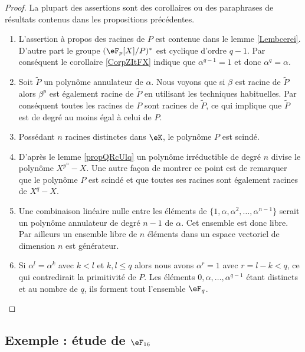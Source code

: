 \begin{proof}
    La plupart des assertions sont des corollaires ou des paraphrases de résultats contenus dans les propositions précédentes.
    \begin{enumerate}
        \item
            L'assertion à propos des racines de \( P\) est contenue dans le lemme \ref{Lembcerei}. D'autre part le groupe \( (\eF_p[X]/P)^*\) est cyclique d'ordre \( q-1\). Par conséquent le corollaire \ref{CorpZItFX} indique que \( \alpha^{q-1}=1\) et donc \( \alpha^q=\alpha\).
        \item
            Soit \( \tilde P\) un polynôme annulateur de \( \alpha\). Nous voyons que si \( \beta\) est racine de \( \tilde P\) alors \( \beta^p\) est également racine de \( \tilde P\) en utilisant les techniques habituelles. Par conséquent toutes les racines de \( P\) sont racines de \( \tilde P\), ce qui implique que \( \tilde P\) est de degré au moins égal à celui de \( P\).
        \item
            Possédant \( n\) racines distinctes dans \( \eK\), le polynôme \( P\) est scindé.
        \item
            D'après le lemme \ref{propQRcUlq} un polynôme irréductible de degré \( n\) divise le polynôme \( X^{p^n}-X\). Une autre façon de montrer ce point est de remarquer que le polynôme \( P\) est scindé et que toutes ses racines sont également racines de \( X^q-X\).
        \item
            Une combinaison linéaire nulle entre les éléments de \( \{ 1,\alpha,\alpha^2,\ldots, \alpha^{n-1} \}\) serait un polynôme annulateur de degré \( n-1\) de \( \alpha\). Cet ensemble est donc libre. Par ailleurs un ensemble libre de \( n\) éléments dans un espace vectoriel de dimension \( n\) est générateur.
        \item
            Si \( \alpha^l=\alpha^k\) avec \( k<l\) et \( k,l\leq q\) alors nous avons \( \alpha^r=1\) avec \( r=l-k<q\), ce qui contredirait la primitivité de \( P\). Les éléments \( 0,\alpha,\ldots, \alpha^{q-1}\) étant distincts et au nombre de \( q\), ils forment tout l'ensemble \( \eF_q\).

    \end{enumerate}
\end{proof}

\subsection{Exemple : étude de \texorpdfstring{$\eF_{16}$}{F16}}

